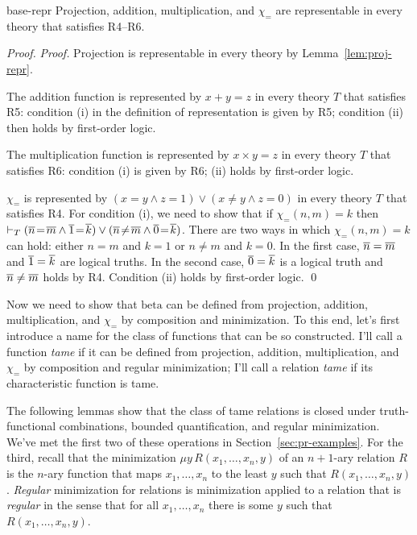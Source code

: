 \begin{lemma}{}{base-repr}
  Projection, addition, multiplication, and $\chi_=$ are representable
  in every theory that satisfies R4--R6.
\end{lemma}
\begin{proof}
  \emph{Proof.}
  Projection is representable in every theory by Lemma~\ref{lem:proj-repr}.

  The addition function is represented by $x+y=z$ in every theory $T$ that satisfies R5: condition (i) in the definition of representation is given by R5; condition (ii) then holds by first-order logic.

  The multiplication function is represented by $x\times y=z$ in every theory $T$ that satisfies R6: condition (i) is given by R6; (ii) holds by first-order logic.

  $\chi_=$ is represented by $(x\!=\!y \land z\!=\!1) \lor (x\!\neq\!y \land z\!=\!0)$ in every theory $T$ that satisfies R4.
  For condition (i),
  we need to show that
  if $\chi_= (n,m) = k$ then $\proves_T {( \num{n}\!=\!\num{m} \land \num{1}\!=\!\num{k})} \lor {(\num{n}\!\neq\!\num{m} \land \num{0}\!=\!\num{k})}$.
  There are two ways in which $\chi_=(n,m) = k$ can hold:
  either $n=m$ and $k=1$ or $n \neq m$ and $k=0$.
  In the first case, $\overline{n}=\overline{m}$ and $\overline{1}=\overline{k}$ are logical truths.
  In the second case, $\overline{0}=\overline{k}$ is a logical truth and $\overline{n}\neq\overline{m}$ holds by R4.
  Condition (ii) holds by first-order logic.
  \qed
\end{proof}

Now we need to show that $\mathrm{beta}$ can be defined
from projection, addition, multiplication, and $\chi_=$
by composition and minimization.
To this end,
let's first introduce a name for the class of functions that can be so constructed.
I'll call a function \emph{tame} if it can be defined
from projection, addition, multiplication, and $\chi_=$
by composition and regular minimization;
I'll call a relation \emph{tame} if its characteristic function is tame.

The following lemmas show that
the class of tame relations is closed under truth-functional combinations,
bounded quantification,
and regular minimization.
We've met the first two of these operations in Section~\ref{sec:pr-examples}.
For the third,
recall that the minimization $\mu y\, R(x_{1},\ldots,x_{n},y)$ of an $n\!+\!1$-ary relation $R$
is the $n$-ary function that maps $x_{1},\ldots,x_{n}$ to the least $y$ such that $R(x_{1},\ldots,x_{n},y)$.
\emph{Regular} minimization for relations is minimization applied to a relation
that is \emph{regular} in the sense that
for all $x_{1},\ldots,x_{n}$ there is some $y$ such that $R(x_{1},\ldots,x_{n},y)$.

